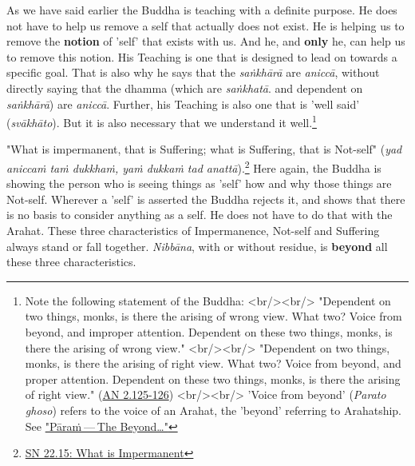 As we have said earlier the Buddha is teaching with a definite purpose.
He does not have to help us remove a self that actually does not exist.
He is helping us to remove the \textbf{notion} of 'self' that exists with us.
And he, and \textbf{only} he, can help us to remove this notion. His Teaching
is one that is designed to lead on towards a specific goal. That is also
why he says that the \emph{saṅkhārā} are \emph{aniccā}, without directly saying
that the dhamma (which are \emph{saṅkhatā}. and dependent on \emph{saṅkhārā})
are \emph{aniccā}. Further, his Teaching is also one that is 'well said'
(\emph{svākhāto}). But it is also necessary that we understand it
well.\footnote{Note the following statement of the Buddha: <br/><br/> "Dependent on two things, monks, is there the arising of wrong view. What two? Voice from beyond, and improper attention. Dependent on these two things, monks, is there the arising of wrong view." <br/><br/> "Dependent on two things, monks, is there the arising of right view. What two? Voice from beyond, and proper attention. Dependent on these two things, monks, is there the arising of right view." (\href{https://suttacentral.net/an2.118-129/en/sujato}{AN 2.125-126}) <br/><br/> 'Voice from beyond' (\emph{Parato ghoso}) refers to the voice of an Arahat, the 'beyond' referring to Arahatship. See \hyperlink{beyond}{"Pāraṁ — The Beyond…​"}}


"What is impermanent, that is Suffering; what is Suffering, that is
Not-self" (\emph{yad aniccaṁ taṁ dukkhaṁ, yaṁ dukkaṁ tad anattā}).\footnote{\href{https://suttacentral.net/sn22.15/en/bodhi}{SN 22.15: What is Impermanent}}
Here again, the Buddha is showing the person who is seeing
things as 'self' how and why those things are Not-self. Wherever a
'self' is asserted the Buddha rejects it, and shows that there is no
basis to consider anything as a self. He does not have to do that with
the Arahat. These three characteristics of Impermanence, Not-self and
Suffering always stand or fall together. \emph{Nibbāna}, with or without
residue, is \textbf{beyond} all these three characteristics.



